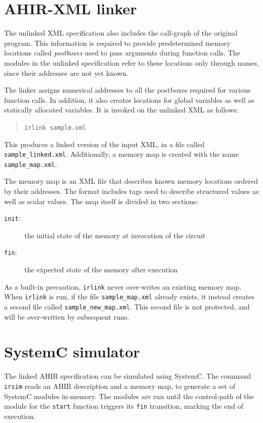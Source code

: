 \documentclass[12pt]{article}
\begin{document}
\section{AHIR-XML linker}

The unlinked XML specification also includes the call-graph of the
original program. This information is required to provide
predetermined memory locations called \textit{postboxes} used to pass
arguments during function calls. The modules in the unlinked
specification refer to these locations only through names, since their
addresses are not yet known.

The linker assigns numerical addresses to all the postboxes required
for various function calls. In addition, it also creates locations for
global variables as well as statically allocated variables. It is
invoked on the unlinked XML as follows:

\begin{quote}
\tt  irlink sample.xml
\end{quote}

This produces a linked version of the input XML, in a file called
\texttt{sample\_linked.xml}. Additionally, a memory map is created with the
name \texttt{sample\_map.xml}.

The memory map is an XML file that describes known memory locations
ordered by their addresses. The format includes tags used to describe
structured values as well as scalar values. The map itself is divided
in two sections:

\begin{description}
  \item [\texttt{init}:] the initial state of the memory at invocation
        of the circuit
  \item [\texttt{fin}:] the expected state of the memory after
        execution
\end{description}

As a built-in precaution, \texttt{irlink} never over-writes an
existing memory map. When \texttt{irlink} is run, if the file
\texttt{sample\_map.xml} already exists, it instead creates a second
file called \texttt{sample\_new\_map.xml}. This second file is not
protected, and will be over-written by subsequent runs.

\section{SystemC simulator}

The linked AHIR specification can be simulated using SystemC. The
command \texttt{irsim} reads an AHIR description and a memory map, to
generate a set of SystemC modules in-memory. The modules are run until
the control-path of the module for the \texttt{start} function
triggers its \texttt{fin} transition, marking the end of execution.
\end{document}
